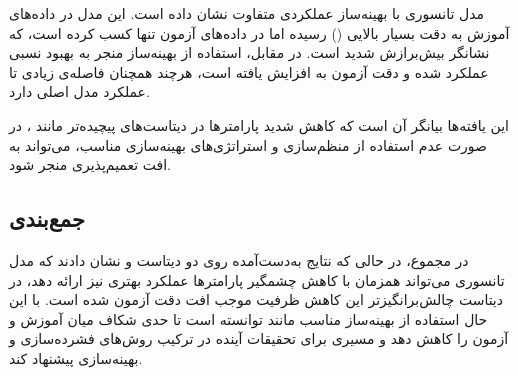 مدل تانسوری با بهینه‌ساز  عملکردی متفاوت نشان داده است. این مدل در داده‌های آموزش به دقت بسیار بالایی () رسیده اما در داده‌های آزمون تنها  کسب کرده است، که نشانگر بیش‌برازش شدید است. در مقابل، استفاده از بهینه‌ساز  منجر به بهبود نسبی عملکرد شده و دقت آزمون به  افزایش یافته است، هرچند همچنان فاصله‌ی زیادی تا عملکرد مدل اصلی دارد.  

این یافته‌ها بیانگر آن است که کاهش شدید پارامترها در دیتاست‌های پیچیده‌تر مانند ، در صورت عدم استفاده از منظم‌سازی و استراتژی‌های بهینه‌سازی مناسب، می‌تواند به افت تعمیم‌پذیری منجر شود. 

\subsection{جمع‌بندی}

در مجموع، در حالی که نتایج به‌دست‌آمده روی دو دیتاست  و  نشان دادند که مدل تانسوری می‌تواند همزمان با کاهش چشمگیر پارامترها عملکرد بهتری نیز ارائه دهد، در دیتاست چالش‌برانگیزتر  این کاهش ظرفیت موجب افت دقت آزمون شده است. با این حال استفاده از بهینه‌ساز مناسب مانند  توانسته است تا حدی شکاف میان آموزش و آزمون را کاهش دهد و مسیری برای تحقیقات آینده در ترکیب روش‌های فشرده‌سازی و بهینه‌سازی پیشنهاد کند.
